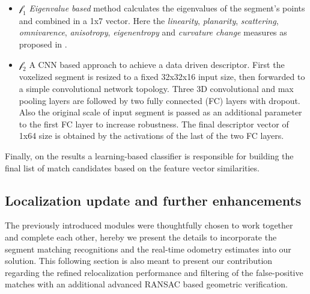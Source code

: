 \documentclass[letterpaper, 10 pt, conference]{ieeeconf}  %
\begin{document}
\begin{itemize}
    \item $\mathscr{f}_1$ \textit{Eigenvalue based} method calculates the eigenvalues of the segment's points and combined in a 1x7 vector. Here  the \textit{linearity}, \textit{planarity}, \textit{scattering}, \textit{omnivarence}, \textit{anisotropy}, \textit{eigenentropy} and \textit{curvature change} measures as proposed in \cite{eigen_features}. 
    \item $\mathscr{f}_2$ A CNN based approach to achieve a data driven descriptor. First the voxelized segment is resized to a fixed 32x32x16 input size, then forwarded to a simple convolutional network topology. Three 3D convolutional and max pooling layers are followed by two fully connected (FC) layers with dropout. Also the original scale of input segment is passed as an additional parameter to the first FC layer to increase robustness. The final descriptor vector of 1x64 size is obtained by the activations of the last of the two FC layers.
\end{itemize}


Finally, on the results a learning-based classifier is responsible for building the final list of match candidates based on the feature vector similarities. 

\subsection{Localization update and further enhancements}\label{our_contribution}

The previously introduced modules were thoughtfully chosen to work together and complete each other, hereby we present the details to incorporate the segment matching recognitions and the real-time odometry estimates into our solution. 
This following section is also meant to present our contribution regarding the refined relocalization performance and filtering of the false-positive matches with an additional advanced RANSAC based geometric verification. 
\end{document}
